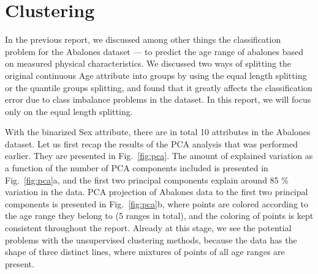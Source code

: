 \documentclass[10pt, paper=a4]{article}
\begin{document}


\section{Clustering}
\label{sec:clustering}
In the previous report, we discussed among other things the classification
problem for the Abalones dataset --- to predict the age range of abalones based
on measured physical characteristics.  We discussed two ways of splitting the
original continuous Age attribute into groups by using the equal length
splitting or the quantile groups splitting, and found that it greatly affects
the classification error due to class imbalance problems in the dataset.  In
this report, we will focus only on the equal length splitting.

With the binarized Sex attribute, there are in total 10 attributes in the
Abalones dataset.  Let us first recap the results of the PCA analysis that was
performed earlier.  They are presented in Fig.~\ref{fig:pca}.  The amount of
explained variation as a function of the number of PCA components included is
presented in Fig.~\ref{fig:pca}a, and the first two principal components explain
around 85 \% variation in the data.  PCA projection of Abalones data to the
first two principal components is presented in Fig.~\ref{fig:pca}b, where points
are colored according to the age range they belong to (5 ranges in total), and
the coloring of points is kept consistent throughout the report.  Already at
this stage, we see the potential problems with the unsupervised clustering
methods, because the data has the shape of three distinct lines, where mixtures
of points of all age ranges are present.
\end{document}
